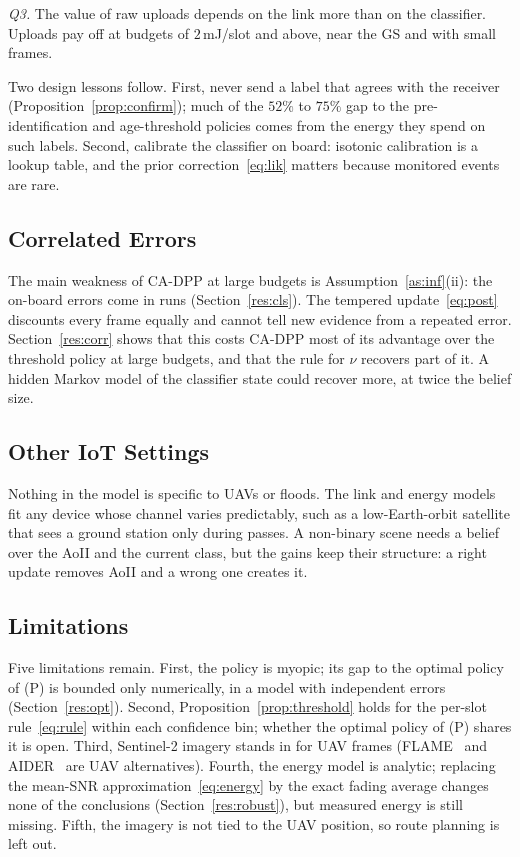 \documentclass[5p,twocolumn]{elsarticle}
\theoremstyle{remark}
\begin{document}
\emph{Q3.} The value of raw uploads depends on the link more than on the classifier. Uploads pay off at budgets of $2$\,mJ/slot and above, near the GS and with small frames.

Two design lessons follow. First, never send a label that agrees with the receiver (Proposition~\ref{prop:confirm}); much of the $52\%$ to $75\%$ gap to the pre-identification and age-threshold policies comes from the energy they spend on such labels. Second, calibrate the classifier on board: isotonic calibration is a lookup table, and the prior correction~\eqref{eq:lik} matters because monitored events are rare.

\subsection{Correlated Errors}
The main weakness of CA-DPP at large budgets is Assumption~\ref{as:inf}(ii): the on-board errors come in runs (Section~\ref{res:cls}). The tempered update~\eqref{eq:post} discounts every frame equally and cannot tell new evidence from a repeated error. Section~\ref{res:corr} shows that this costs CA-DPP most of its advantage over the threshold policy at large budgets, and that the rule for $\nu$ recovers part of it. A hidden Markov model of the classifier state could recover more, at twice the belief size.

\subsection{Other IoT Settings}
Nothing in the model is specific to UAVs or floods. The link and energy models fit any device whose channel varies predictably, such as a low-Earth-orbit satellite that sees a ground station only during passes. A non-binary scene needs a belief over the AoII and the current class, but the gains keep their structure: a right update removes AoII and a wrong one creates it.

\subsection{Limitations}
Five limitations remain. First, the policy is myopic; its gap to the optimal policy of (P) is bounded only numerically, in a model with independent errors (Section~\ref{res:opt}). Second, Proposition~\ref{prop:threshold} holds for the per-slot rule~\eqref{eq:rule} within each confidence bin; whether the optimal policy of (P) shares it is open. Third, Sentinel-2 imagery stands in for UAV frames (FLAME~\cite{shamsoshoara2021flame} and AIDER~\cite{kyrkou2020aider} are UAV alternatives). Fourth, the energy model is analytic; replacing the mean-SNR approximation~\eqref{eq:energy} by the exact fading average changes none of the conclusions (Section~\ref{res:robust}), but measured energy is still missing. Fifth, the imagery is not tied to the UAV position, so route planning is left out.
\end{document}

